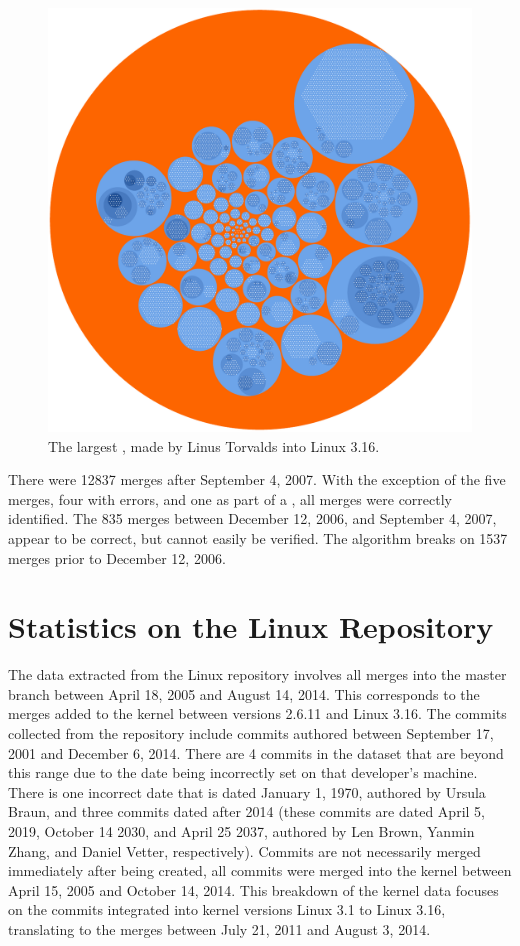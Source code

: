 \begin{figure}[htpb]
  \centering
  \includegraphics[width=0.8\linewidth]{Figures/model/big_tree.pdf}
  \caption{The largest \mt{}, made by Linus Torvalds into Linux 3.16.}
  \label{fig:big_tree}
\end{figure}

There were 12837 merges after September 4, 2007. With the exception of
the five merges, four with errors, and one as part of a \foxtrot{}, all
merges were correctly identified. The 835 merges between December 12,
2006, and September 4, 2007, appear to be correct, but cannot easily be
verified. The algorithm breaks on 1537 merges prior to December 12,
2006.

\section{Statistics on the Linux Repository}
\label{sec:statistics_on_the_linux_repository}

The data extracted from the Linux repository involves all merges into
the master branch between April 18, 2005 and August 14, 2014.
This corresponds to the merges added to the kernel between versions
2.6.11 and Linux 3.16.
The commits collected from the repository include commits authored
between September 17, 2001 and December 6, 2014.
There are 4 commits in the dataset that are beyond this range due to
the date being incorrectly set on that developer's machine.
There is one incorrect date that is dated January 1, 1970, authored by
Ursula Braun, and three commits dated after 2014
(these commits are dated April 5, 2019, October 14 2030, and
April 25 2037, authored by Len Brown, Yanmin Zhang, and Daniel Vetter,
respectively).
Commits are not necessarily merged immediately after being created,
all commits were merged into the kernel between April 15, 2005 and
October 14, 2014.
This breakdown of the kernel data focuses on the commits integrated
into kernel versions Linux 3.1 to Linux 3.16, translating to the merges
between July 21, 2011 and August 3, 2014.

